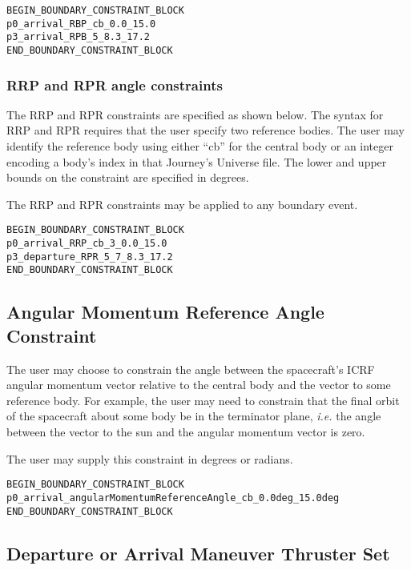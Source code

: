 \documentclass[11pt]{article}
\begin{document}
\begin{verbatim}
BEGIN_BOUNDARY_CONSTRAINT_BLOCK
p0_arrival_RBP_cb_0.0_15.0
p3_arrival_RPB_5_8.3_17.2
END_BOUNDARY_CONSTRAINT_BLOCK
\end{verbatim}


\subsubsection{RRP and RPR angle constraints}
\label{subsubsec:RRP_and_RP}

The RRP and RPR constraints are specified as shown below. The syntax for RRP and RPR requires that the user specify two reference bodies. The user may identify the reference body using either ``cb'' for the central body or an integer encoding a body's index in that Journey's Universe file. The lower and upper bounds on the constraint are specified in degrees.

The RRP and RPR constraints may be applied to any boundary event.

\begin{verbatim}
BEGIN_BOUNDARY_CONSTRAINT_BLOCK
p0_arrival_RRP_cb_3_0.0_15.0
p3_departure_RPR_5_7_8.3_17.2
END_BOUNDARY_CONSTRAINT_BLOCK
\end{verbatim}

\subsection{Angular Momentum Reference Angle Constraint}
\label{subsec:angular_momentum_reference_angle}

The user may choose to constrain the angle between the spacecraft's ICRF angular momentum vector relative to the central body and the vector to some reference body. For example, the user may need to constrain that the final orbit of the spacecraft about some body be in the terminator plane, \textit{i.e.} the angle between the vector to the sun and the angular momentum vector is zero.

The user may supply this constraint in degrees or radians.

\begin{verbatim}
BEGIN_BOUNDARY_CONSTRAINT_BLOCK
p0_arrival_angularMomentumReferenceAngle_cb_0.0deg_15.0deg
END_BOUNDARY_CONSTRAINT_BLOCK
\end{verbatim}


\subsection{Departure or Arrival Maneuver Thruster Set}
\label{subsec:boundary_constrainThrusterSet}
\end{document}
